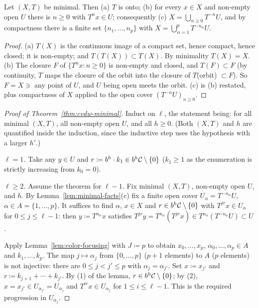 \begin{lemma}
  \label{lem:minimal-facts}
  \leanok
  Let $(X,T)$ be minimal.  Then (a) $T$ is onto; (b) for every $x \in X$ and non-empty open
  $U$ there is $n \geq 0$ with $T^nx \in U$; consequently (c) $X = \bigcup_{n \geq 0}T^{-n}U$,
  and by compactness there is a finite set $\{n_1,\dots,n_p\}$ with
  $X = \bigcup_{\alpha=1}^{p} T^{-n_\alpha}U$.
\end{lemma}

\begin{proof}
  (a) $T(X)$ is the continuous image of a compact set, hence compact, hence closed; it is
  non-empty; and $T(T(X)) \subset T(X)$.  By minimality $T(X) = X$.
  (b) The closure $F$ of $\{T^nx : n \geq 0\}$ is non-empty and closed, and $T(F) \subset F$
  (by continuity, $T$ maps the closure of the orbit into the closure of $T$(orbit)
  $\subset F$).  So $F = X \ni$ any point of $U$, and $U$ being open meets the orbit.
  (c) is (b) restated, plus compactness of $X$ applied to the open cover $(T^{-n}U)_{n\geq0}$.
\end{proof}

\begin{proof}[Proof of Theorem~\ref{thm:cvdw-minimal}]
  Induct on $\ell$, the statement being: for all minimal $(X,T)$, all non-empty open $U$, and
  all $h \geq 0$.  (Both $(X,T)$ and $h$ are quantified inside the induction, since the
  inductive step uses the hypothesis with a larger $h'$.)

  \emph{$\ell = 1$.}  Take any $y \in U$ and $r \coloneqq b^h \cdot k_1 \in b^h\mathcal{C}\setminus\{0\}$
  ($k_1 \geq 1$ as the enumeration is strictly increasing from $k_0 = 0$).

  \emph{$\ell \geq 2$.}  Assume the theorem for $\ell - 1$.  Fix minimal $(X,T)$, non-empty
  open $U$, and $h$.  By Lemma~\ref{lem:minimal-facts}(c) fix a finite open cover
  $U_\alpha = T^{-n_\alpha}U$, $\alpha \in A = \{1,\dots,p\}$.  It suffices to find
  $\alpha$, $x \in X$ and $r \in b^h\mathcal{C}\setminus\{0\}$ with $T^{jr}x \in U_\alpha$ for
  $0 \leq j \leq \ell - 1$: then $y \coloneqq T^{n_\alpha}x$ satisfies
  $T^{jr}y = T^{n_\alpha}(T^{jr}x) \in T^{n_\alpha}(T^{-n_\alpha}U) \subset U$.

  Apply Lemma~\ref{lem:color-focusing} with $J \coloneqq p$ to obtain $x_0,\dots,x_p$,
  $\alpha_0,\dots,\alpha_p \in A$ and $k_1,\dots,k_p$.  The map $j \mapsto \alpha_j$ from
  $\{0,\dots,p\}$ ($p+1$ elements) to $A$ ($p$ elements) is not injective: there are
  $0 \leq j < j' \leq p$ with $\alpha_j = \alpha_{j'}$.  Set $x \coloneqq x_{j'}$ and
  $r \coloneqq k_{j+1} + \cdots + k_{j'}$.  By (1) of the lemma, $r \in b^h\mathcal{C}\setminus\{0\}$;
  by (2), $x = x_{j'} \in U_{\alpha_{j'}} = U_{\alpha_j}$ and $T^{ir}x \in U_{\alpha_j}$ for
  $1 \leq i \leq \ell - 1$.  This is the required progression in $U_{\alpha_j}$.
\end{proof}

